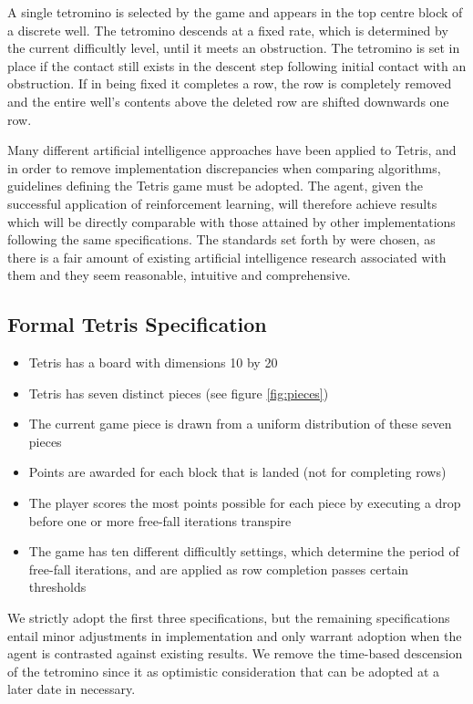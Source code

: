 \documentclass{rucsthesis}
\begin{document}
A  single tetromino is selected by the game and appears in the top centre block of a discrete well. The tetromino descends at a fixed rate, which is determined by the current difficultly level, until it meets an obstruction. The tetromino is set in place if the contact still exists in the descent step following initial contact with an obstruction. If in being fixed it completes a row, the row is completely removed and the entire well's contents above the deleted row are shifted downwards one row.

Many different artificial intelligence approaches have been applied to Tetris, and in order to remove implementation discrepancies when comparing algorithms, guidelines defining the Tetris game must be adopted. The agent, given the successful application of reinforcement learning, will therefore achieve results which will be directly comparable with those attained by other implementations following the same specifications. The standards set forth by \cite{tetstand} were chosen, as there is a fair amount of existing artificial intelligence research associated with them and they seem reasonable, intuitive and comprehensive.

\subsection*{Formal Tetris Specification \citep{tetstand}} 
\begin{itemize}
\item{Tetris has a board with dimensions 10 by 20}
\item{Tetris has seven distinct pieces (see figure \ref{fig:pieces})}
\item{The current game piece is drawn from a uniform distribution of these seven pieces}
\item{Points are awarded for each block that is landed (not for completing rows)}
\item{The player scores the most points possible for each piece by executing a drop before one or more free-fall iterations transpire}
\item{The game has ten different difficultly settings, which determine the period of free-fall iterations, and are applied as row completion passes certain thresholds}
\end{itemize}

We strictly adopt the first three specifications, but the remaining specifications entail minor adjustments in implementation and only warrant adoption when the agent is contrasted against existing results. We remove the time-based descension of the tetromino since it as optimistic consideration that can be adopted at a later date in necessary.
\end{document}
